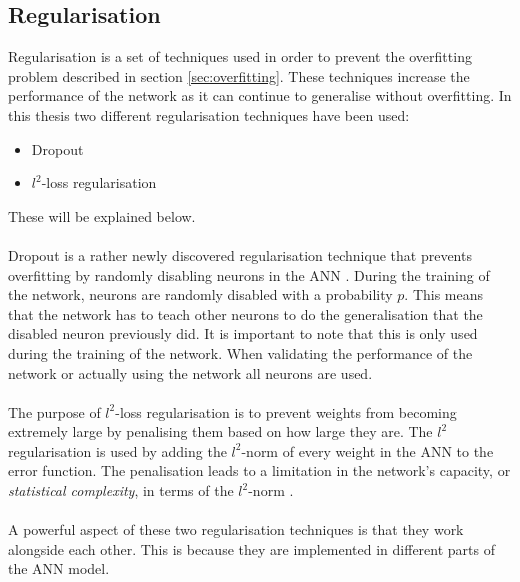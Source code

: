 \subsection{Regularisation}\label{sec:regularisation}
Regularisation is a set of techniques used in order to prevent the overfitting problem described in section \ref{sec:overfitting}. These techniques increase the performance of the network as it can continue to generalise without overfitting. 
In this thesis two different regularisation techniques have been used:
\begin{itemize}
    \item Dropout
    \item $l^2$-loss regularisation
\end{itemize}
These will be explained below.
\\\\
Dropout is a rather newly discovered regularisation technique that prevents overfitting by randomly disabling neurons in the ANN \parencite{srivastava2014dropout}. During the training of the network, neurons are randomly disabled with a probability $p$. This means that the network has to teach other neurons to do the generalisation that the disabled neuron previously did. It is important to note that this is only used during the training of the network. When validating the performance of the network or actually using the network all neurons are used.
\\\\
The purpose of $l^2$-loss regularisation is to prevent weights from becoming extremely large by penalising them based on how large they are. The $l^2$ regularisation is used by adding the $l^2$-norm of every weight in the ANN to the error function. The penalisation leads to a limitation in the network's capacity, or \textit{statistical complexity}, in terms of the $l^2$-norm \parencite{neyshabur2015norm}. 
\\\\
A powerful aspect of these two regularisation techniques is that they work alongside each other. This is because they are implemented in different parts of the ANN model.

